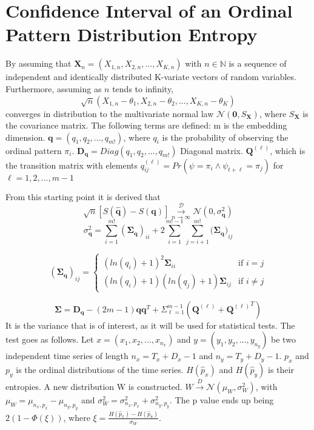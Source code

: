 \section{Confidence Interval of an Ordinal Pattern Distribution Entropy}
By assuming that $\textbf{X}_n = (X_{1,n},X_{2,n},...,X_{K,n})$ with $n \in \mathbb{N}$ is a sequence of independent and identically distributed K-variate vectors of random variables. Furthermore, assuming as $n$ tends to infinity, $$\sqrt{n}(X_{1,n}-\theta_1,X_{2,n}-\theta_2,...,X_{K,n}-\theta_K)$$ 
converges in distribution to the multivariate normal law $\mathscr{N}(\textbf{0},S_{\textbf{X}})$, where $S_{\textbf{X}}$ is the covariance matrix. The following terms are defined:
m is the embedding dimension.
$\mathbf{q}=(q_1,q_2,...,q_{m!})$, where $q_i$ is the probability of observing the ordinal pattern $\pi_i$.
$\mathbf{D_q}=Diag(q_1,q_2,...,q_{m!})$ Diagonal matrix.
$\mathbf{Q}^{(\ell)}$, which is the transition matrix with elements
$q_{ij}^{(\ell)}=Pr(\psi =\pi_i \wedge \psi_{t+\ell}=\pi_j)$
for $\ell = 1,2,...,m-1$


From this starting point it is derived that 
$$\sqrt{n}[S(\hat{\textbf{q}})-S(\textbf{q})] \overset{\mathscr{D}}{\underset{n\rightarrow\infty}{\longrightarrow}}\mathscr{N}(0,\sigma_{\textbf{q}}^2)$$
$$ \sigma_{\textbf{q}}^2=\sum_{i=1}^{m!}(\mathbf{\Sigma_q})_{ii}+2\sum_{i=1}^{m!-1}\sum_{j=i+1}^{m!}(\bm{\Sigma_q)}_{ij}$$

\begin{displaymath}
  (\mathbf{\Sigma_q})_{ij} = \left\{
    \begin{array}{lr}
      (ln(q_i)+1)^2\mathbf{\Sigma}_{ii} & \text{if $i=j$}\\
      (ln(q_i)+1)(ln(q_j)+1)\mathbf{\Sigma}_{ij} & \text{if $i \neq j$}
    \end{array}
  \right.
\end{displaymath} 

$$\mathbf{\Sigma}=\mathbf{D_q}-(2m-1)\mathbf{qq}^T+\Sigma_{\ell=1}^{m-1}(\mathbf{Q}^{(\ell)}+{\mathbf{Q}^{(\ell)}}^T)$$  
\cite{Rey2023}It is the variance that is of interest, as it will be used for statistical tests. The test goes as follows. Let $x=(x_1,x_2,...,x_{n_x})$ and $y=(y_1,y_2,...,y_{n_y})$ be two independent time series of length $n_x=T_x+D_x-1$ and $n_y=T_y+D_y-1$. $p_x$ and $p_y$ is the ordinal distributions of the time series. $H(\hat{p}_x)$ and $H(\hat{p}_y)$ is their entropies. A new distribution W is constructed. $W \overset{D}{\rightarrow}\mathscr{N}(\mu_W,\sigma_W^2)$, with $\mu_W=\mu_{n_x,p_x}-\mu_{n_y,p_y}$ and $\sigma_W^2=\sigma_{n_x,p_x}^2+\sigma_{n_y,p_y}^2$. 
The p value ends up being $2(1-\Phi(\xi))$, where $\xi = \frac{H(\hat{p}_x)-H(\hat{p}_u)}{\sigma_W}$. \cite{Chagas2022}

